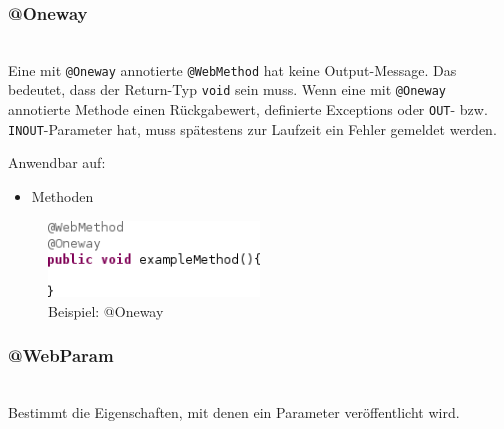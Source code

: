\documentclass[runningheads]{llncs}
\begin{document}
    \subsubsection{@Oneway}\ \\
      Eine mit \texttt{@Oneway} annotierte \texttt{@WebMethod} hat keine Output-Message. Das
      bedeutet, dass der Return-Typ \texttt{void} sein muss. Wenn eine mit \texttt{@Oneway}
      annotierte Methode einen Rückgabewert, definierte Exceptions oder \texttt{OUT}- bzw.
      \texttt{INOUT}-Parameter hat, muss spätestens zur Laufzeit ein Fehler gemeldet werden.

      \noindent{}Anwendbar auf:
      \begin{itemize}
       \item Methoden\vfill
      \end{itemize}\vfill
    \begin{figure}[tbh]
      \centering
      \includegraphics[width=0.5\textwidth]{../images/AtOneway.png}
      \caption{Beispiel: @Oneway}
      \label{fig:oneway}
    \end{figure}

    \subsubsection{@WebParam}\ \\
      Bestimmt die Eigenschaften, mit denen ein Parameter veröffentlicht wird.
\end{document}
